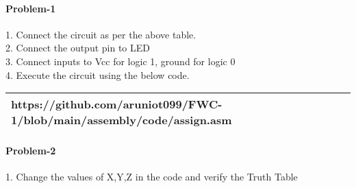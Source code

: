 \documentclass[journal,12pt,twocolumn]{IEEEtran}
\begin{document}
    \paragraph{Problem-1}
    
    1. Connect the circuit as per the above table.\\
    2. Connect the output pin to LED\\
    3. Connect inputs to Vcc for logic 1, ground for logic 0\\
    4. Execute the circuit using the below code.\\
   
\begin{tabularx}{0.46\textwidth} { 
  | >{\centering\arraybackslash}X |}
  \hline
  https://github.com/aruniot099/FWC-1/blob/main/assembly/code/assign.asm\\
  \hline
\end{tabularx}

   \paragraph{Problem-2}
1. Change the values of X,Y,Z in the code and verify the Truth Table\\



\end{document}
